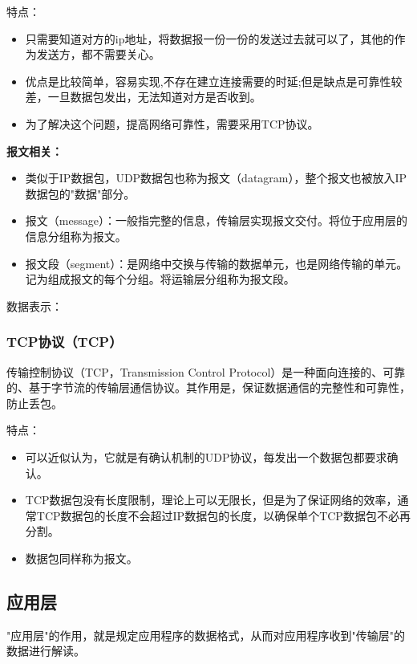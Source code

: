 \documentclass[UTF8]{article}%
\begin{document}
特点：

\begin{itemize}
    \item 只需要知道对方的ip地址，将数据报一份一份的发送过去就可以了，其他的作为发送方，都不需要关心。
    \item 优点是比较简单，容易实现,不存在建立连接需要的时延;但是缺点是可靠性较差，一旦数据包发出，无法知道对方是否收到。
    \item 为了解决这个问题，提高网络可靠性，需要采用TCP协议。
\end{itemize}

\textbf{报文相关：}

\begin{itemize}
    \item 类似于IP数据包，UDP数据包也称为报文（datagram），整个报文也被放入IP数据包的"数据"部分。
    \item 报文（message）：一般指完整的信息，传输层实现报文交付。将位于应用层的信息分组称为报文。
    \item 报文段（segment）：是网络中交换与传输的数据单元，也是网络传输的单元。记为组成报文的每个分组。将运输层分组称为报文段。
\end{itemize}

数据表示：

\subsubsection{TCP协议（TCP）}

传输控制协议（TCP，Transmission Control Protocol）是一种面向连接的、可靠的、基于字节流的传输层通信协议。其作用是，保证数据通信的完整性和可靠性，防止丢包。

特点：

\begin{itemize}
    \item 可以近似认为，它就是有确认机制的UDP协议，每发出一个数据包都要求确认。
    \item TCP数据包没有长度限制，理论上可以无限长，但是为了保证网络的效率，通常TCP数据包的长度不会超过IP数据包的长度，以确保单个TCP数据包不必再分割。
    \item 数据包同样称为报文。
\end{itemize}

\subsection{应用层}

"应用层"的作用，就是规定应用程序的数据格式，从而对应用程序收到"传输层"的数据进行解读。
\end{document}
